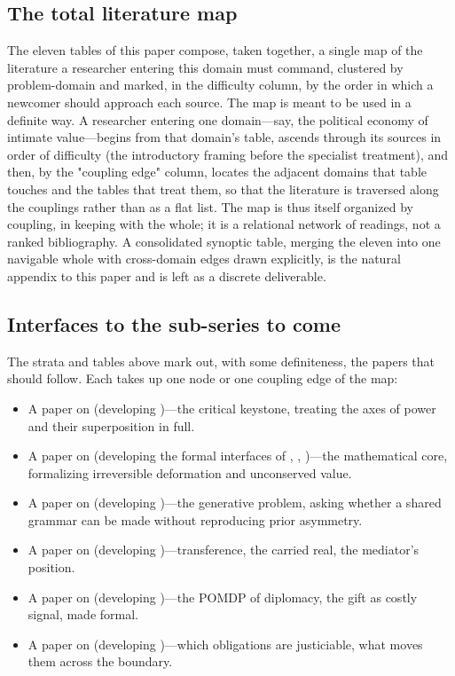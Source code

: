 \subsection{The total literature map}
The eleven tables of this paper compose, taken together, a single map of the literature a researcher entering this domain must command, clustered by problem-domain and marked, in the difficulty column, by the order in which a newcomer should approach each source. The map is meant to be used in a definite way. A researcher entering one domain---say, the political economy of intimate value---begins from that domain's table, ascends through its sources in order of difficulty (the introductory framing before the specialist treatment), and then, by the "coupling edge" column, locates the adjacent domains that table touches and the tables that treat them, so that the literature is traversed along the couplings rather than as a flat list. The map is thus itself organized by coupling, in keeping with the whole; it is a relational network of readings, not a ranked bibliography. A consolidated synoptic table, merging the eleven into one navigable whole with cross-domain edges drawn explicitly, is the natural appendix to this paper and is left as a discrete deliverable.

\subsection{Interfaces to the sub-series to come}
The strata and tables above mark out, with some definiteness, the papers that should follow. Each takes up one node or one coupling edge of the map:
\begin{itemize}
\item A paper on  (developing )---the critical keystone, treating the axes of power and their superposition in full.
\item A paper on  (developing the formal interfaces of , , )---the mathematical core, formalizing irreversible deformation and unconserved value.
\item A paper on  (developing )---the generative problem, asking whether a shared grammar can be made without reproducing prior asymmetry.
\item A paper on  (developing )---transference, the carried real, the mediator's position.
\item A paper on  (developing )---the POMDP of diplomacy, the gift as costly signal, made formal.
\item A paper on  (developing )---which obligations are justiciable, what moves them across the boundary.
\end{itemize}

